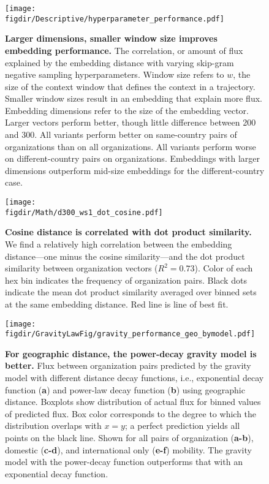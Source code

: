 \documentclass[12pt]{article} %
\def\figdir{../Figs}
\begin{document}
%
%
\begin{figure}[p!]
	\centering
	\texttt{[image: \\figdir/Descriptive/hyperparameter\_performance.pdf]}
	\caption{
		\textbf{Larger dimensions, smaller window size improves embedding performance.}
		The correlation, or amount of flux explained by the embedding distance with varying skip-gram negative sampling hyperparameters.
		Window size refers to $w$, the size of the context window that defines the context in a trajectory.
		Smaller window sizes result in an embedding that explain more flux.
		Embedding dimensions refer to the size of the embedding vector.
		Larger vectors perform better, though little difference between 200 and 300.
		All variants perform better on same-country pairs of organizations than on all organizations.
		All variants perform worse on different-country pairs on organizations.
		Embeddings with larger dimensions outperform mid-size embeddings for the different-country case.
	}
	\label{fig:supp:cosdot}
\end{figure}


%
%
\begin{figure}[p!]
	\centering
	\texttt{[image: \\figdir/Math/d300\_ws1\_dot\_cosine.pdf]}
	\caption{
		\textbf{Cosine distance is correlated with dot product similarity.}
		We find a relatively high correlation between the embedding distance---one minus the cosine similarity---and the dot product similarity between organization vectors ($R^2 = 0.73$).
		Color of each hex bin indicates the frequency of organization pairs. 
		Black dots indicate the mean dot product similarity averaged over binned sets at the same embedding distance.
		Red line is line of best fit.
	}
	\label{fig:supp:hyperparams}
\end{figure}



%
%
\begin{figure}[p!]
	\centering
	\texttt{[image: \\figdir/GravityLawFig/gravity\_performance\_geo\_bymodel.pdf]}
	\caption{
		\textbf{For geographic distance, the power-decay gravity model is better.}
		Flux between organization pairs predicted by the gravity model with different distance decay functions, i.e., exponential decay function (\textbf{a}) and power-law decay function (\textbf{b}) using geographic distance.
		Boxplots show distribution of actual flux for binned values of predicted flux.
		Box color corresponds to the degree to which the distribution overlaps with $x = y$; 
		a perfect prediction yields all points on the black line.
		Shown for all pairs of organization (\textbf{a-b}), domestic (\textbf{c-d}), and international only (\textbf{e-f}) mobility.
		The gravity model with the power-decay function outperforms that with an exponential decay function.
	}
	\label{fig:supp:predict_geo_bymodel}
\end{figure}
\end{document}
